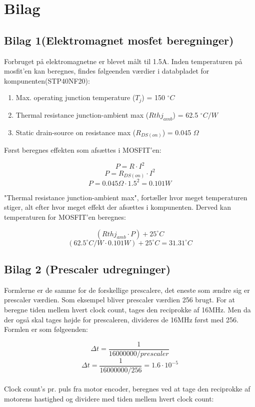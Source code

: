 \documentclass[11pt]{article}
\begin{document}
\section{Bilag}

\subsection{Bilag 1(Elektromagnet mosfet beregninger)}
\label{subsec:mosfet}

Forbruget på elektromagnetne er blevet målt til 1.5A. Inden temperaturen på mosfit'en kan beregnes, findes følgeenden værdier i databpladet for kompunenten(STP40NF20):
\begin{enumerate}
\item Max. operating junction temperature ($T_j$) = 150 $^\circ C$
\item Thermal resistance junction-ambient max ($Rthj_{amb}$) = 62.5 $^\circ C/W$
\item Static drain-source on resistance max ($R_{DS(on)}$) = 0.045 $\Omega$
\end{enumerate}
Først beregnes effekten som afsættes i MOSFIT'en:

$$P = R \cdot I^2$$
$$P = R_{DS(on)} \cdot I^2$$
$$P = 0.045 \Omega \cdot 1.5^2 = 0.101 W$$

"Thermal resistance junction-ambient max", fortæller hvor meget temperaturen stiger, alt efter hvor meget effekt der afsættes i kompunenten. Derved kan temperaturen for MOSFIT'en beregnes:

$$(Rthj_{amb} \cdot P) + 25^\circ C$$
$$(62.5^\circ C/W  \cdot 0.101 W) + 25^\circ C = 31.31 ^\circ C$$



\newpage
\subsection{Bilag 2 (Prescaler udregninger)}
\label{subsec:prescaler_udregninger}
Formlerne er de samme for de forskellige prescalere, det eneste som ændre sig er prescaler værdien. Som eksempel bliver prescaler værdien 256 brugt. For at beregne tiden mellem hvert clock count, tages den reciprokke af 16MHz. Men da der også skal tages højde for prescaleren, divideres de 16MHz først med 256. Formlen er som følgeenden:

$$\Delta t = \frac{1}{16000000/prescaler}$$
$$\Delta t = \frac{1}{16000000/256} = 1.6 \cdot 10^{-5}$$\\

Clock count's pr. puls fra motor encoder, beregnes ved at tage den reciprokke af motorens hastighed og dividere med tiden mellem hvert clock count:
\end{document}
